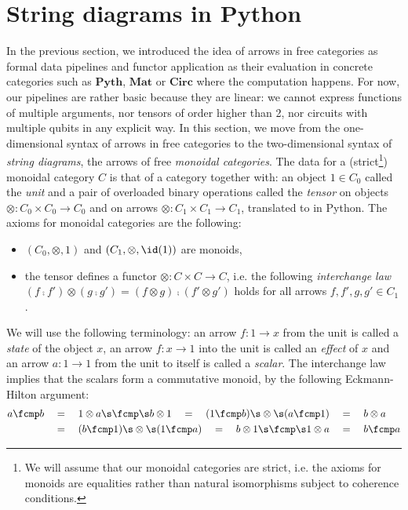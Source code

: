 
\section{String diagrams in Python}

In the previous section, we introduced the idea of arrows in free categories as formal data pipelines and functor application as their evaluation in concrete categories such as $\mathbf{Pyth}$, $\mathbf{Mat}$ or $\mathbf{Circ}$ where the computation happens.
For now, our pipelines are rather basic because they are linear: we cannot express functions of multiple arguments, nor tensors of order higher than 2, nor circuits with multiple qubits in any explicit way.
In this section, we move from the one-dimensional syntax of arrows in free categories to the two-dimensional syntax of \emph{string diagrams}, the arrows of free \emph{monoidal categories}.
The data for a (strict\footnote
{We will assume that our monoidal categories are strict, i.e. the axioms for monoids are equalities rather than natural isomorphisms subject to coherence conditions.}) monoidal category $C$ is that of a category together with:
an object $1 \in C_0$ called the \emph{unit} and a pair of overloaded binary operations called the \emph{tensor} on objects $\otimes : C_0 \times C_0 \to C_0$ and on arrows $\otimes : C_1 \times C_1 \to C_1$, translated to  in Python.
The axioms for monoidal categories are the following:
\begin{itemize}
\item $(C_0, \otimes, 1)$ and $(C_1, \otimes, \id(1))$ are monoids,
\item the tensor defines a functor $\otimes : C \times C \to C$, i.e. the following \emph{interchange law} $(f \fcmp f') \otimes (g \fcmp g') = (f \otimes g) \fcmp (f' \otimes g')$ holds for all arrows $f, f', g, g' \in C_1$.
\end{itemize}
We will use the following terminology: an arrow $f : 1 \to x$ from the unit is called a \emph{state} of the object $x$, an arrow $f : x \to 1$ into the unit is called an \emph{effect} of $x$ and an arrow $a : 1 \to 1$ from the unit to itself is called a \emph{scalar}.
The interchange law implies that the scalars form a commutative monoid, by the following Eckmann-Hilton argument:
\begin{align*}
a \fcmp b
&\quad = \quad 1 \otimes a \s \fcmp \s b \otimes 1
\quad = \quad (1 \fcmp b) \s \otimes \s (a \fcmp 1)
\quad = \quad b \otimes a
\\
&\quad = \quad (b \fcmp 1) \s \otimes \s (1 \fcmp a)
\quad = \quad b \otimes 1 \s \fcmp \s 1 \otimes a
\quad = \quad b \fcmp a
\end{align*}

